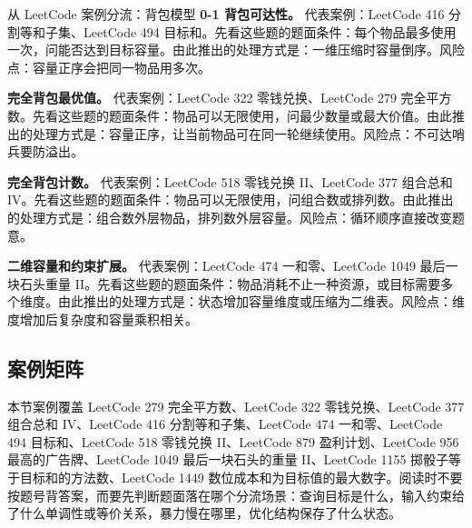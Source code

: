 \begin{principlebox}{从 LeetCode 案例分流：背包模型}
\textbf{0-1 背包可达性。}
代表案例：LeetCode 416 分割等和子集、LeetCode 494 目标和。先看这些题的题面条件：每个物品最多使用一次，问能否达到目标容量。由此推出的处理方式是：一维压缩时容量倒序。风险点：容量正序会把同一物品用多次。

\textbf{完全背包最优值。}
代表案例：LeetCode 322 零钱兑换、LeetCode 279 完全平方数。先看这些题的题面条件：物品可以无限使用，问最少数量或最大价值。由此推出的处理方式是：容量正序，让当前物品可在同一轮继续使用。风险点：不可达哨兵要防溢出。

\textbf{完全背包计数。}
代表案例：LeetCode 518 零钱兑换 II、LeetCode 377 组合总和 IV。先看这些题的题面条件：物品可以无限使用，问组合数或排列数。由此推出的处理方式是：组合数外层物品，排列数外层容量。风险点：循环顺序直接改变题意。

\textbf{二维容量和约束扩展。}
代表案例：LeetCode 474 一和零、LeetCode 1049 最后一块石头重量 II。先看这些题的题面条件：物品消耗不止一种资源，或目标需要多个维度。由此推出的处理方式是：状态增加容量维度或压缩为二维表。风险点：维度增加后复杂度和容量乘积相关。

\end{principlebox}

\subsection{案例矩阵}

本节案例覆盖 LeetCode 279 完全平方数、LeetCode 322 零钱兑换、LeetCode 377 组合总和 IV、LeetCode 416 分割等和子集、LeetCode 474 一和零、LeetCode 494 目标和、LeetCode 518 零钱兑换 II、LeetCode 879 盈利计划、LeetCode 956 最高的广告牌、LeetCode 1049 最后一块石头的重量 II、LeetCode 1155 掷骰子等于目标和的方法数、LeetCode 1449 数位成本和为目标值的最大数字。阅读时不要按题号背答案，而要先判断题面落在哪个分流场景：查询目标是什么，输入约束给了什么单调性或等价关系，暴力慢在哪里，优化结构保存了什么状态。

